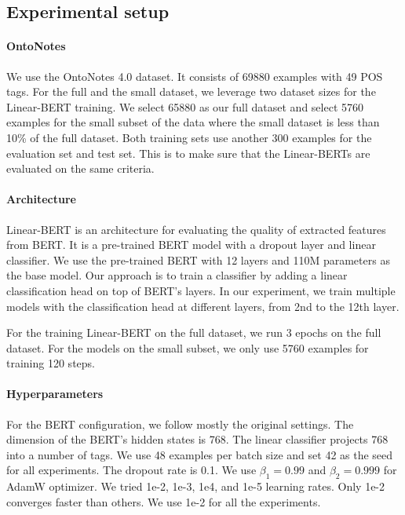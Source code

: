 \documentclass[11pt,a4paper]{article}
\begin{document}
\subsection{Experimental setup}

\paragraph{OntoNotes} We use the OntoNotes 4.0 dataset. It consists of 69880 examples with 49 POS tags. For the full and the small dataset,
we leverage two dataset sizes for the Linear-BERT training. We select 65880 as our full dataset and select 5760 examples
for the small subset of the data where the small dataset is less than 10\% of the full dataset. Both training sets use another 300 examples for the evaluation set and test set. This is to make sure that the Linear-BERTs are evaluated on the same criteria.

\paragraph{Architecture}

Linear-BERT is an architecture for evaluating the quality of extracted features from BERT. It is a pre-trained BERT model with a dropout layer and linear classifier. We use the pre-trained BERT with 12 layers and 110M parameters as the base model. Our approach is to train a classifier by adding a linear classification head on top of BERT's layers. In our experiment, we train multiple models with the classification head at different layers, from 2nd to the 12th layer. 

For the training Linear-BERT on the full dataset, we run 3 epochs on the full dataset. For the models on the small subset, we only use 5760 examples for training 120 steps. 


\paragraph{Hyperparameters}
For the BERT configuration, we follow mostly the original settings. The dimension of the BERT's hidden states is 768. The linear classifier projects 768 into a number of tags. We use 48 examples per batch size and set 42 as the seed for all experiments. The dropout rate is 0.1. We use $\beta_{1} = 0.99 $ and $\beta_{2} = 0.999 $ for AdamW optimizer. We tried  1e-2, 1e-3, 1e4, and 1e-5 learning rates. Only 1e-2 converges faster than others. We use 1e-2 for all the experiments. 
\end{document}
